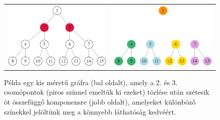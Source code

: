 \begin{figure}[t]
  \centering
  \begin{tabular}{ll}
    \includegraphics[scale=0.38]{images/bocndp_before.png}
     &
    \includegraphics[scale=0.38]{images/bocndp_after.png}
  \end{tabular}
  \caption{
    Példa egy kis méretű gráfra (bal oldalt), amely a 2. és 3. csomópontok (piros színnel emeltük ki ezeket) törlése után
    szétesik öt összefüggő komponensre (jobb oldalt), amelyeket különböző színekkel jelöltünk meg a könnyebb láthatóság kedvéért.
  }
  \label{fig:BOCNDP_EXAMPLE}
\end{figure}
